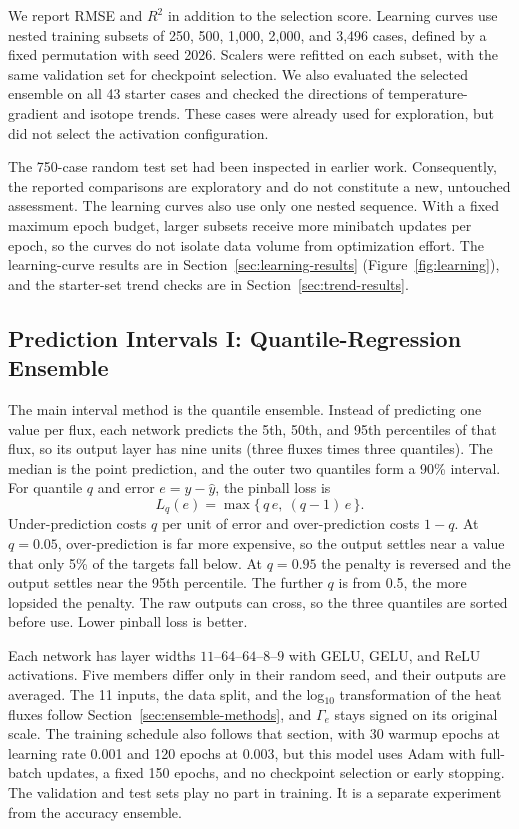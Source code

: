 \documentclass[12pt,letterpaper]{article}
\begin{document}
We report RMSE and $R^2$ in addition to the selection
score. Learning curves use nested training subsets of 250, 500, 1,000, 2,000,
and 3,496 cases, defined by a fixed permutation with seed 2026. Scalers were
refitted on each subset, with the same validation set for checkpoint selection.
We also evaluated the selected ensemble on all 43 starter cases and checked
the directions of temperature-gradient and isotope trends. These cases were
already used for exploration, but did not select the activation configuration.

The 750-case random test set had been inspected in earlier work. Consequently,
the reported comparisons are exploratory and do not constitute a new,
untouched assessment. The learning curves also use only one nested sequence.
With a fixed maximum epoch budget, larger subsets receive more minibatch updates per
epoch, so the curves do not isolate data volume from optimization effort.
The learning-curve results are in Section~\ref{sec:learning-results}
(Figure~\ref{fig:learning}), and the starter-set trend checks are in
Section~\ref{sec:trend-results}.

\subsection{Prediction Intervals I: Quantile-Regression Ensemble}
\label{sec:interval-methods}

The main interval method is the quantile ensemble. Instead of
predicting one value per flux, each
network predicts the 5th, 50th, and 95th percentiles of that flux, so its
output layer has nine units (three fluxes times three quantiles). The median is
the point prediction, and the outer two quantiles form a 90\% interval. For
quantile $q$ and error $e = y - \hat{y}$, the pinball loss is
\begin{equation}
  L_q(e) = \max\{\,q\,e,\ (q-1)\,e\,\}.
  \label{eq:pinball}
\end{equation}
Under-prediction costs $q$ per unit of error and over-prediction costs $1-q$.
At $q = 0.05$, over-prediction is far more expensive, so the output settles
near a value that only 5\% of the targets fall below. At $q = 0.95$ the
penalty is reversed and the output settles near the 95th percentile. The
further $q$ is from 0.5, the more lopsided the penalty. The raw outputs can
cross, so the three quantiles are sorted before use. Lower pinball loss is
better.

Each network has layer widths $11$--$64$--$64$--$8$--$9$ with GELU, GELU, and
ReLU activations. Five members differ only in their random seed, and their
outputs are averaged. The 11 inputs, the data split, and the log$_{10}$
transformation of the heat fluxes follow Section~\ref{sec:ensemble-methods},
and $\Gamma_e$ stays signed on its original scale. The training schedule also
follows that section, with 30 warmup epochs at learning rate 0.001 and 120
epochs at 0.003, but this model uses Adam with full-batch updates, a fixed 150
epochs, and no checkpoint selection or early stopping. The validation and test
sets play no part in training. It is a separate experiment from the
accuracy ensemble.
\end{document}
